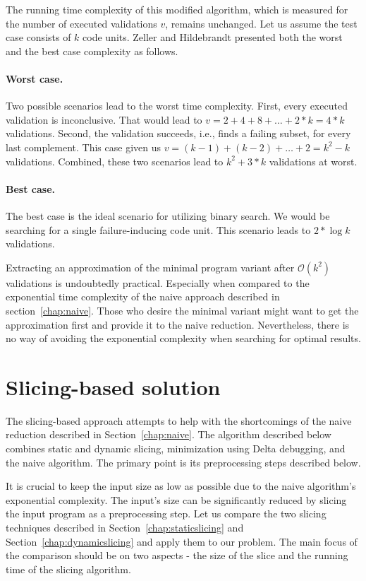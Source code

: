 The running time complexity of this modified algorithm, which is measured 
for the number of executed validations $v$, remains unchanged. 
Let us assume the test case consists of $k$ code units. 
Zeller and Hildebrandt\citep*{Zeller02} presented both the worst 
and the best case complexity as follows.

\paragraph{Worst case.} Two possible scenarios lead to the worst time 
complexity. 
First, every executed validation is inconclusive. 
That would lead to $v = 2 + 4 + 8 + \ldots + 2 * k = 4 * k$ validations. 
Second, the validation succeeds, i.e., finds a failing subset, for every 
last complement. 
This case given us $v = (k - 1) + (k - 2) + \ldots + 2 = k^2 - k$ validations.
Combined, these two scenarios lead to $k^2 + 3 * k$ validations at worst.

\paragraph{Best case.} The best case is the ideal scenario for utilizing 
binary search. 
We would be searching for a single failure-inducing code unit. 
This scenario leads to $2 * \log{}k$ validations.

Extracting an approximation of the minimal program variant after 
$\mathcal{O}(k^2)$ validations is undoubtedly practical. 
Especially when compared to the exponential time complexity of the naive 
approach described in section~\ref{chap:naive}. 
Those who desire the minimal variant might want to get the approximation 
first and provide it to the naive reduction. 
Nevertheless, there is no way of avoiding the exponential complexity when 
searching for optimal results.

\section{Slicing-based solution}\label{chap:systematic}

The slicing-based approach attempts to help with the shortcomings of 
the naive reduction described in Section~\ref{chap:naive}.
The algorithm described below combines static and dynamic slicing, 
minimization using Delta debugging, and the naive algorithm. 
The primary point is its preprocessing steps described below. 

It is crucial to keep the input size as low as possible due to the naive 
algorithm's exponential complexity.  
The input's size can be significantly reduced by slicing the input program 
as a preprocessing step.  
Let us compare the two slicing techniques described 
in Section~\ref{chap:staticslicing} and Section~\ref{chap:dynamicslicing} and 
apply them to our problem. 
The main focus of the comparison should be on two aspects - the size of 
the slice and the running time of the slicing algorithm. 


